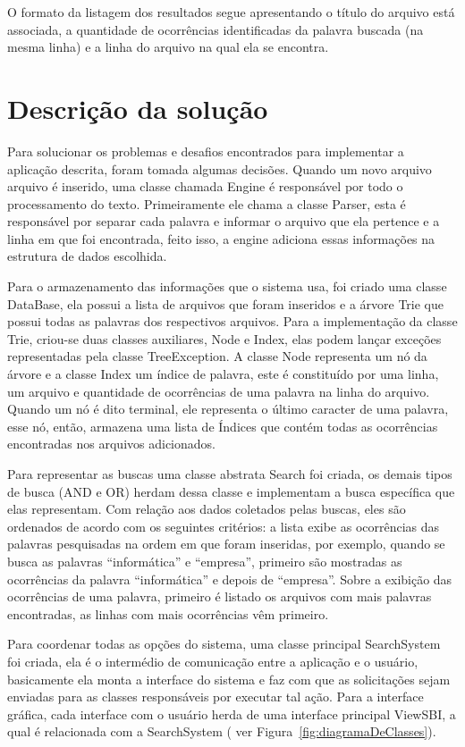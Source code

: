 \documentclass[12pt]{article}
\begin{document}
	O formato da listagem dos resultados segue apresentando o título do arquivo está associada, a quantidade de ocorrências identificadas da palavra buscada (na mesma linha) e a linha do arquivo na qual ela se encontra.

\section{Descrição da solução}
 
 Para solucionar os problemas e desafios encontrados para implementar a aplicação descrita, foram tomada algumas decisões. Quando um novo arquivo arquivo é inserido, uma classe chamada Engine é responsável por todo o processamento do texto. Primeiramente ele chama a classe Parser, esta é responsável por separar cada palavra e informar o arquivo que ela pertence e a linha em que foi encontrada, feito isso, a engine adiciona essas informações na estrutura de dados  escolhida.
 
	Para o armazenamento das informações que o sistema usa, foi criado uma classe DataBase, ela possui a lista de arquivos que foram inseridos e a árvore Trie que possui  todas as palavras dos respectivos arquivos. Para a implementação da classe Trie, criou-se duas classes auxiliares, Node e Index, elas podem lançar exceções representadas pela classe TreeException. A classe Node representa um nó da árvore e a classe Index um índice de palavra, este é constituído por uma linha, um arquivo e quantidade de ocorrências de uma palavra na linha do arquivo. Quando um nó é dito terminal, ele representa o último caracter de uma palavra, esse nó, então, armazena uma lista de Índices que contém todas as ocorrências encontradas nos arquivos adicionados.
	
	Para representar as buscas uma classe abstrata Search foi criada, os demais tipos de busca (AND e OR) herdam dessa classe e implementam a busca específica que elas representam. Com relação aos dados coletados pelas buscas, eles são ordenados de acordo com os seguintes critérios: a lista exibe as ocorrências das palavras pesquisadas na ordem em que foram inseridas, por exemplo, quando se busca as palavras “informática” e “empresa”, primeiro são mostradas as ocorrências da palavra “informática” e depois de “empresa”. Sobre a exibição das ocorrências de uma palavra, primeiro é listado os arquivos com mais palavras encontradas, as linhas com mais ocorrências vêm primeiro.
	
	Para coordenar todas as opções do sistema, uma classe principal SearchSystem foi criada, ela é o intermédio de comunicação entre a aplicação e o usuário, basicamente ela monta a interface do sistema e faz com que as solicitações sejam enviadas para as classes responsáveis por executar tal ação. Para a interface gráfica, cada interface com o usuário herda de uma interface principal ViewSBI, a qual é relacionada com a SearchSystem ( ver Figura~\ref{fig:diagramaDeClasses}).
\end{document}
